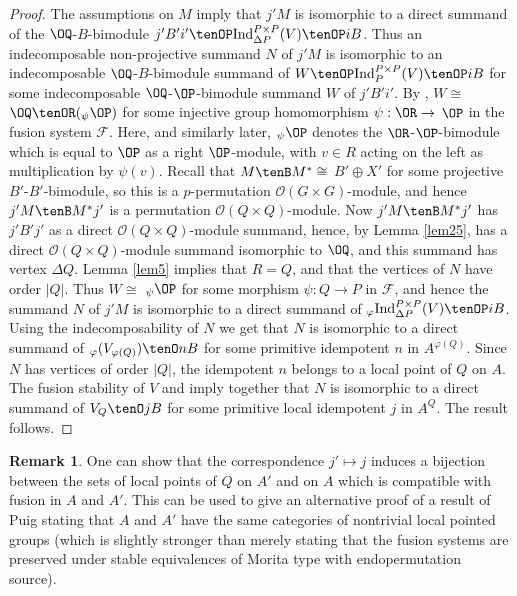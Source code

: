 \documentclass{amsart} %
\theoremstyle{plain}\newtheorem{Theorem}{Theorem}[section]
\theoremstyle{plain}\newtheorem{Conjecture}[Theorem]{Conjecture}
\theoremstyle{plain}\newtheorem{Corollary}[Theorem]{Corollary}
\theoremstyle{plain}\newtheorem{Lemma}[Theorem]{Lemma}
\theoremstyle{plain}\newtheorem{Proposition}[Theorem]{Proposition}
\theoremstyle{definition}\newtheorem{Definition}[Theorem]{Definition}
\theoremstyle{definition}\newtheorem{Example}[Theorem]{Example}
\theoremstyle{definition}\newtheorem{Examples}[Theorem]{Examples}
\theoremstyle{definition}\newtheorem{Remark}[Theorem]{Remark}
\theoremstyle{definition}\newtheorem{Remarks}[Theorem]{Remarks}
\theoremstyle{plain}\newtheorem{Statement}[Theorem]{}
\def\CF{{\mathcal{F}}}    \def\OS{{\mathcal{O}S}}
\def\CO{{\mathcal{O}}}
\def\Ind{\mathrm{Ind}}           \def\tenK{\otimes_K}
\begin{document}
\begin{proof}
The assumptions on $M$ imply  that $j'M$ is isomorphic to
a direct summand of the $\OQ$-$B$-bimodule
$j'B'i'\tenOP \Ind^{P\times P}_{\Delta P}(V)\tenOP iB$.
Thus an indecomposable non-projective summand $N$ of $j'M$ is
isomorphic to an indecomposable $\OQ$-$B$-bimodule summand of 
$W \tenOP \Ind^{P\times P}_P(V)\tenOP iB$ for some indecomposable
$\OQ$-$\OP$-bimodule summand $W$ of $j'B'i'$. By \cite[Theorem 8.7.1]{LiBookII},
$W\cong$ $\OQ\tenOR ({_\psi{\OP}})$ for some injective group homomorphism
$\psi : \OR\to$ $\OP$ in the fusion system $\CF$. Here, and similarly later, 
${_\psi\OP}$ denotes
the $\OR$-$\OP$-bimodule which is equal to $\OP$ as a right $\OP$-module,
with $v\in R$ acting on the left as multiplication by $\psi(v)$.
Recall that $M\tenB M^*\cong$ $B'\oplus X'$ for some projective
$B'$-$B'$-bimodule, so this is a $p$-permutation $\CO(G\times G)$-module,
and hence $j'M\tenB M^*j'$ is a permutation $\CO(Q\times Q)$-module.
Now $j'M\tenB M^*j'$ has $j'B'j'$ as a direct $\CO(Q\times Q)$-module
summand, hence, by Lemma \ref{lem25},  has a direct $\CO(Q\times Q)$-module 
summand isomorphic  to $\OQ$, and this summand has vertex  $\Delta Q$.
Lemma \ref{lem5} implies that $R=Q$,
and that the vertices of $N$ have order $|Q|$. Thus $W\cong$ ${_\psi{\OP}}$ for
some morphism $\psi : Q\to P$ in $\CF$, and hence
the summand $N$ of $j'M$ is isomorphic to a direct summand of 
${_\varphi{\Ind^{P\times P}_{\Delta P}(V)\tenOP iB}}$. Using the
indecomposability of $N$ we get that $N$ is isomorphic to a direct
summand of ${_\varphi{(V_{\varphi(Q)})\tenO nB}}$ for some primitive
 idempotent $n$ in $A^{\varphi(Q)}$. Since $N$ has vertices of order $|Q|$, the
 idempotent $n$ belongs to a local point of $Q$ on $A$.
The fusion stability of $V$ and \cite[Theorem 8.7.4]{LiBookII}
 imply together  that $N$ is
isomorphic to a direct summand of $V_Q\tenO jB$ for some
primitive local idempotent $j$ in $A^Q$. The result follows.
\end{proof}

\begin{Remark}
One can show that the correspondence $j'\mapsto j$ induces a bijection
between the sets of local points of $Q$ on $A'$ and on $A$ which is
compatible with fusion in $A$ and $A'$. This
can be used to give an alternative proof of a result of Puig
stating that $A$ and $A'$ have the same categories of nontrivial local pointed
groups (which is slightly stronger than merely stating that the
fusion systems are preserved under stable equivalences of Morita
type with endopermutation source). 
\end{Remark}
\end{document}
